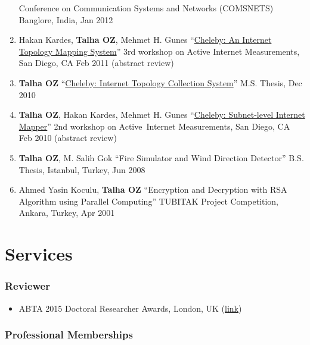\documentclass[11pt, letter]{article}
\begin{document}
\begin{raggedright}
\begin{enumerate}
  Conference on Communication Systems and Networks (COMSNETS) Banglore,
  India, Jan 2012
\item
  Hakan Kardes, \textbf{Talha OZ}, Mehmet H. Gunes
  ``\href{http://www.mli.gmu.edu/toz/publications/2011-AIMS.pdf}{Cheleby:
  An Internet Topology Mapping System}'' 3rd workshop on Active Internet
  Measurements, San Diego, CA Feb 2011 (abstract review)
\item
  \textbf{Talha OZ}
  ``\href{http://www.mli.gmu.edu/toz/publications/MS-Thesis.pdf}{Cheleby:
  Internet Topology Collection System}'' M.S. Thesis, Dec 2010
\item
  \textbf{Talha OZ}, Hakan Kardes, Mehmet H. Gunes
  ``\href{http://www.mli.gmu.edu/toz/publications/2010-AIMS.pdf}{Cheleby:
  Subnet-level Internet Mapper}'' 2nd workshop on Active~Internet
  Measurements, San Diego, CA Feb 2010 (abstract review)
\item
  \textbf{Talha OZ}, M. Salih Gok ``Fire Simulator and Wind Direction
  Detector'' B.S. Thesis, Istanbul, Turkey, Jun 2008
\item
  Ahmed Yasin Koculu, \textbf{Talha OZ} ``Encryption and Decryption with
  RSA Algorithm using Parallel Computing'' TUBITAK Project Competition,
  Ankara, Turkey, Apr 2001
\end{enumerate}

\section{Services}\label{services}

\subsubsection{Reviewer}\label{reviewer}

\begin{itemize}
\itemsep1pt\parskip0pt
\item
  ABTA 2015 Doctoral Researcher Awards, London, UK
  (\href{http://abtanet.org.uk/Awards/Detail/8/2015-ABTA-Doctoral-Researcher-Awards}{link})
\end{itemize}

\subsubsection{Professional Memberships}\label{professional-memberships}


\end{raggedright}
\end{document}
